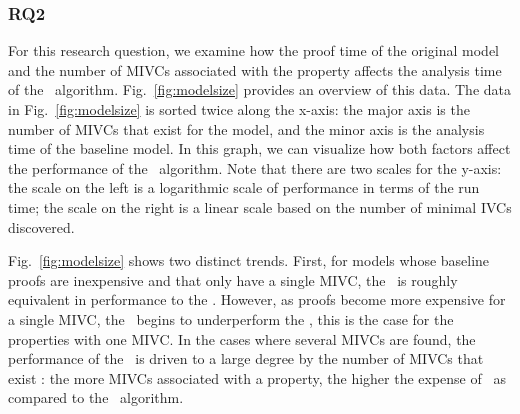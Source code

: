 %

\vspace{0.1in}
\subsubsection{RQ2} For this research question, we examine how the proof time of the original model and the number of MIVCs associated with the property affects the analysis time of the \aivcalg\ algorithm.  Fig.~\ref{fig:modelsize} provides an overview of this data.  The data in Fig.~\ref{fig:modelsize} is sorted twice along the x-axis: the major axis is the number of MIVCs that exist for the model, and the minor axis is the analysis time of the baseline model.  In this graph, we can visualize how both factors affect the performance of the \aivcalg\ algorithm.  Note that there are two scales for the y-axis: the scale on the left is a logarithmic scale of performance in terms of the run time; the scale on the right is a linear scale based on the number of minimal IVCs discovered.

Fig.~\ref{fig:modelsize} shows two distinct trends.  First, for models whose baseline proofs are inexpensive and that only have a single MIVC, the \aivcalg\ is roughly equivalent in performance to the \ucbfalg.  %
However, as proofs become more expensive for a single MIVC, the \aivcalg\ begins to underperform the \ucbfalg , this is the case for the properties with one MIVC.  In the cases where several MIVCs are found, the performance of the \aivcalg\ is driven to a large degree by the number of MIVCs that exist : the more MIVCs associated with a property, the higher the expense of \aivcalg\ as compared to the \ucbfalg\ algorithm.

